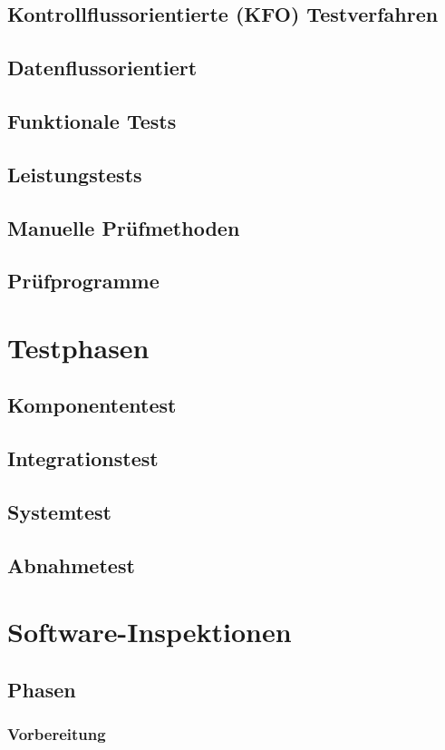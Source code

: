 \documentclass[a4paper]{article}
\theoremstyle{break}
\begin{document}
\subsection{Kontrollflussorientierte (KFO) Testverfahren}
\subsection{Datenflussorientiert}
\subsection{Funktionale Tests}
\subsection{Leistungstests}
\subsection{Manuelle Prüfmethoden}
\subsection{Prüfprogramme}
\section{Testphasen}
\subsection{Komponententest}
\subsection{Integrationstest}
\subsection{Systemtest}
\subsection{Abnahmetest}
\section{Software-Inspektionen}
\subsection{Phasen}
\subsubsection{Vorbereitung}
\end{document}
